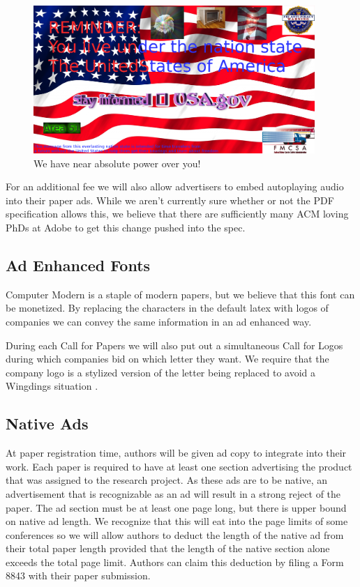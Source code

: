 \begin{figure}
\centering
\includegraphics[width=0.95\textwidth]{figures/usa-ad.png}
\caption{We have near absolute power over you! }
\label{fig:usa}
\end{figure}

For an additional fee we will also allow advertisers to embed autoplaying audio
into their paper ads.
While we aren't currently sure whether or not the PDF specification allows
this, we believe that there are sufficiently many ACM loving PhDs at Adobe to
get this change  pushed into the spec.

\subsection{Ad Enhanced Fonts}
Computer Modern is a staple of modern papers, but we believe that this font can
be monetized.
By replacing the characters in the default latex with logos of companies we can
convey the same information in an ad enhanced way.

During each Call for Papers we will also put out a simultaneous Call for
Logos during which companies bid on which letter they want.
We require that the company logo is a stylized version of the letter being
replaced to avoid a Wingdings situation .


\subsection{Native Ads}

At paper registration time, authors will be given ad copy to integrate into
their work.
Each paper is required to have at least one section advertising the product
that was assigned to the research project.
As these ads are to be native, an advertisement that is recognizable as an ad
will result in a strong reject of the paper.
The ad section must be at least one page long, but there is upper bound on
native ad length.
We recognize that this will eat into the page limits of some conferences so we
will allow authors to deduct the length of the native ad from their total paper
length provided that the length of the native section alone exceeds the total
page limit.
Authors can claim this deduction by filing a Form 8843 with their paper
submission.

